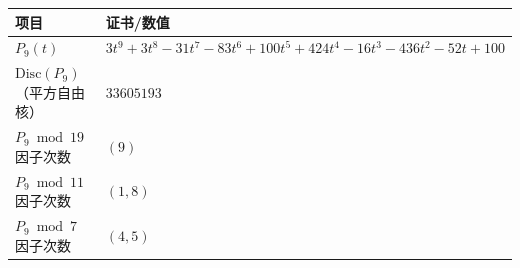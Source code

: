 \begin{table}[H]
\centering
\begin{tabular}{ll}
\toprule
\textbf{项目} & \textbf{证书/数值} \\
\midrule
$P_9(t)$ & $3 t^{9} + 3 t^{8} - 31 t^{7} - 83 t^{6} + 100 t^{5} + 424 t^{4} - 16 t^{3} - 436 t^{2} - 52 t + 100$ \\
$\mathrm{Disc}(P_9)$（平方自由核） & $33605193$ \\
$P_9\bmod 19$ 因子次数 & $(9)$ \\
$P_9\bmod 11$ 因子次数 & $(1,8)$ \\
$P_9\bmod 7$ 因子次数 & $(4,5)$ \\
\bottomrule
\end{tabular}
\end{table}
